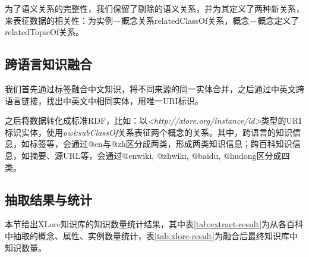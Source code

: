 
为了语义关系的完整性，我们保留了剔除的语义关系，并为其定义了两种新关系，来表征数据的相关性：为实例－概念关系relatedClassOf关系，概念－概念定义了relatedTopicOf关系。

\subsection{跨语言知识融合}
            

我们首先通过标签融合中文知识，将不同来源的同一实体合并，之后通过中英文跨语言链接，找出中英文中相同实体，用唯一URI标识。

之后将数据转化成标准RDF，比如：以\textit{<http://xlore.org/instance/id>}类型的URI标识实体，使用\textit{owl:subClassOf}关系表征两个概念的关系。其中，跨语言的知识信息，如标签等，会通过@en与@zh区分成两类，形成两类知识信息；跨百科知识信息，如摘要、源URL等，会通过@enwiki, @zhwiki, @baidu, @hudong区分成四类。

\subsection{抽取结果与统计}
本节给出XLore知识库的知识数量统计结果，其中表\ref{tab:extract-result}为从各百科中抽取的概念、属性、实例数量统计，表\ref{tab:xlore-result}为融合后最终知识库中知识数量。

